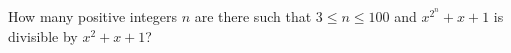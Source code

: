 How many positive integers $n$ are there such that $3 \leq n \leq 100$ and $x^{2^{n}} + x + 1$ is divisible by $x^2 + x + 1$?
